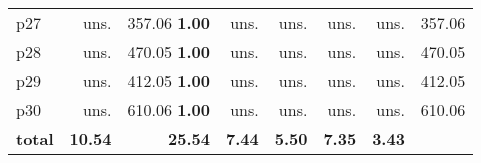 \begin{tabular}{|l|rrrrrr|r|}
p27 & uns. & {\footnotesize 357.06} \textbf{1.00} & uns. & uns. & uns. & uns. & 357.06\\
p28 & uns. & {\footnotesize 470.05} \textbf{1.00} & uns. & uns. & uns. & uns. & 470.05\\
p29 & uns. & {\footnotesize 412.05} \textbf{1.00} & uns. & uns. & uns. & uns. & 412.05\\
p30 & uns. & {\footnotesize 610.06} \textbf{1.00} & uns. & uns. & uns. & uns. & 610.06\\
\hline
\textbf{total} & \textbf{10.54} & \textbf{25.54} & \textbf{7.44} & \textbf{5.50} & \textbf{7.35} & \textbf{3.43} & \\
\hline
\end{tabular}

